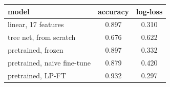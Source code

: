 \begin{tabular}{lcc}
\toprule
model & accuracy & log-loss \\
\midrule
linear, 17 features & 0.897 & 0.310 \\
tree net, from scratch & 0.676 & 0.622 \\
pretrained, frozen & 0.897 & 0.332 \\
pretrained, naive fine-tune & 0.879 & 0.420 \\
pretrained, LP-FT & 0.932 & 0.297 \\
\bottomrule
\end{tabular}
